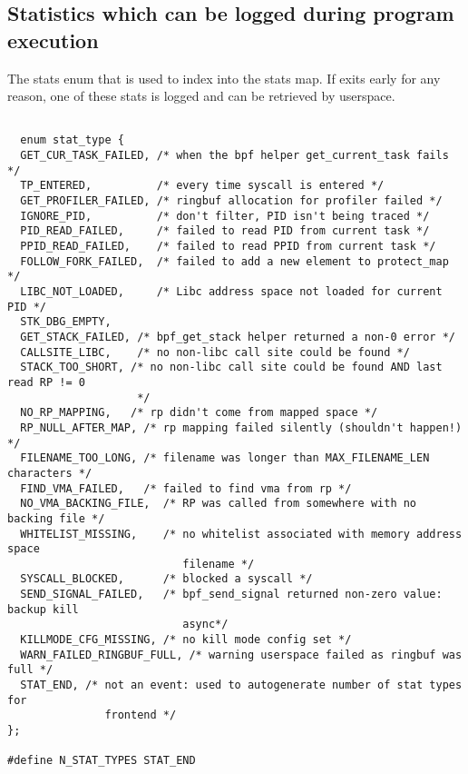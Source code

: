 \subsection{Statistics which can be logged during \af program execution}
\begin{listing}[H]
    \caption{The stats enum that is used to index into the stats map. If
    \af exits early for any reason, one of these stats is logged and can be
  retrieved by userspace.}\label{lst:stat-enum}
  \begin{verbatim}

  enum stat_type {
  GET_CUR_TASK_FAILED, /* when the bpf helper get_current_task fails */
  TP_ENTERED,          /* every time syscall is entered */
  GET_PROFILER_FAILED, /* ringbuf allocation for profiler failed */
  IGNORE_PID,          /* don't filter, PID isn't being traced */
  PID_READ_FAILED,     /* failed to read PID from current task */
  PPID_READ_FAILED,    /* failed to read PPID from current task */
  FOLLOW_FORK_FAILED,  /* failed to add a new element to protect_map */
  LIBC_NOT_LOADED,     /* Libc address space not loaded for current PID */
  STK_DBG_EMPTY,
  GET_STACK_FAILED, /* bpf_get_stack helper returned a non-0 error */
  CALLSITE_LIBC,    /* no non-libc call site could be found */
  STACK_TOO_SHORT, /* no non-libc call site could be found AND last read RP != 0
                    */
  NO_RP_MAPPING,   /* rp didn't come from mapped space */
  RP_NULL_AFTER_MAP, /* rp mapping failed silently (shouldn't happen!) */
  FILENAME_TOO_LONG, /* filename was longer than MAX_FILENAME_LEN characters */
  FIND_VMA_FAILED,   /* failed to find vma from rp */
  NO_VMA_BACKING_FILE,  /* RP was called from somewhere with no backing file */
  WHITELIST_MISSING,    /* no whitelist associated with memory address space
                           filename */
  SYSCALL_BLOCKED,      /* blocked a syscall */
  SEND_SIGNAL_FAILED,   /* bpf_send_signal returned non-zero value: backup kill
                           async*/
  KILLMODE_CFG_MISSING, /* no kill mode config set */
  WARN_FAILED_RINGBUF_FULL, /* warning userspace failed as ringbuf was full */
  STAT_END, /* not an event: used to autogenerate number of stat types for
               frontend */
};

#define N_STAT_TYPES STAT_END

\end{verbatim}
\end{listing}

\clearpage

